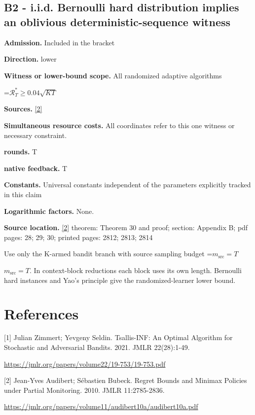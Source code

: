 \documentclass[10pt,a4paper]{article}
\newcommand{\AtlasMath}[1]{\par\begingroup\centering\setbox0=\hbox{$\displaystyle #1$}\ifdim\wd0>1.4\linewidth\typeout{ATLAS WIDE FORMULA: \the\wd0}\fi\ifdim\wd0>\linewidth\resizebox{\linewidth}{!}{\box0}\else\box0\fi\par\endgroup}
\newcommand{\AtlasInlineMath}[1]{\begingroup\setbox0=\hbox{$#1$}\ifdim\wd0>.4\linewidth\endgroup\AtlasMath{#1}\else\endgroup$#1$\fi}
\begin{document}
\subsection{B2 - i.i.d. Bernoulli hard distribution implies an oblivious deterministic-sequence witness}
\textbf{Admission.} Included in the bracket

\textbf{Direction.} lower

\textbf{Witness or lower-bound scope.} All randomized adaptive algorithms

\AtlasMath{\mathcal{R}_T^*\ge0.04\sqrt{KT}}
\textbf{Sources.} \href{https://jmlr.org/papers/volume11/audibert10a/audibert10a.pdf}{[2]}

\textbf{Simultaneous resource costs.} All coordinates refer to this one witness or necessary constraint.

\textbf{rounds.} T

\textbf{native feedback.} T

\textbf{Constants.} Universal constants independent of the parameters explicitly tracked in this claim

\textbf{Logarithmic factors.} None.

\textbf{Source location.} \href{https://jmlr.org/papers/volume11/audibert10a/audibert10a.pdf}{[2]} theorem: Theorem 30 and proof; section: Appendix B; pdf pages: 28; 29; 30; printed pages: 2812; 2813; 2814

Use only the K-armed bandit branch with source sampling budget \AtlasInlineMath{m_{\mathrm{src}}=T}. In context-block reductions each block uses its own length. Bernoulli hard instances and Yao's principle give the randomized-learner lower bound.

\section{References}
[1] Julian Zimmert; Yevgeny Seldin. Tsallis-INF: An Optimal Algorithm for Stochastic and Adversarial Bandits. 2021. JMLR 22(28):1-49.

\url{https://jmlr.org/papers/volume22/19-753/19-753.pdf}

[2] Jean-Yves Audibert; Sébastien Bubeck. Regret Bounds and Minimax Policies under Partial Monitoring. 2010. JMLR 11:2785-2836.

\url{https://jmlr.org/papers/volume11/audibert10a/audibert10a.pdf}
\end{document}
